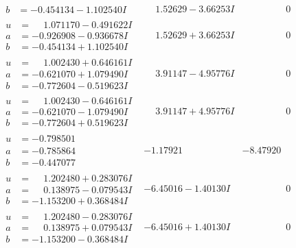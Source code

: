 \documentclass[1p]{elsarticle_modified}
\theoremstyle{definition}
\begin{document}
$$\begin{array}{c|c|c}
\begin{aligned}
b &= -0.454134 - 1.102540 I\end{aligned}
 & \phantom{-}1.52629 - 3.66253 I & \phantom{-0.000000 } 0 \\ \hline\begin{aligned}
u &= \phantom{-}1.071170 - 0.491622 I \\
a &= -0.926908 - 0.936678 I \\
b &= -0.454134 + 1.102540 I\end{aligned}
 & \phantom{-}1.52629 + 3.66253 I & \phantom{-0.000000 } 0 \\ \hline\begin{aligned}
u &= \phantom{-}1.002430 + 0.646161 I \\
a &= -0.621070 + 1.079490 I \\
b &= -0.772604 - 0.519623 I\end{aligned}
 & \phantom{-}3.91147 - 4.95776 I & \phantom{-0.000000 } 0 \\ \hline\begin{aligned}
u &= \phantom{-}1.002430 - 0.646161 I \\
a &= -0.621070 - 1.079490 I \\
b &= -0.772604 + 0.519623 I\end{aligned}
 & \phantom{-}3.91147 + 4.95776 I & \phantom{-0.000000 } 0 \\ \hline\begin{aligned}
u &= -0.798501\phantom{ +0.000000I} \\
a &= -0.785864\phantom{ +0.000000I} \\
b &= -0.447077\phantom{ +0.000000I}\end{aligned}
 & -1.17921\phantom{ +0.000000I} & -8.47920\phantom{ +0.000000I} \\ \hline\begin{aligned}
u &= \phantom{-}1.202480 + 0.283076 I \\
a &= \phantom{-}0.138975 - 0.079543 I \\
b &= -1.153200 + 0.368484 I\end{aligned}
 & -6.45016 - 1.40130 I & \phantom{-0.000000 } 0 \\ \hline\begin{aligned}
u &= \phantom{-}1.202480 - 0.283076 I \\
a &= \phantom{-}0.138975 + 0.079543 I \\
b &= -1.153200 - 0.368484 I\end{aligned}
 & -6.45016 + 1.40130 I & \phantom{-0.000000 } 0 \\ \hline\begin{aligned}

\end{aligned}
\end{array}$$
\end{document}
